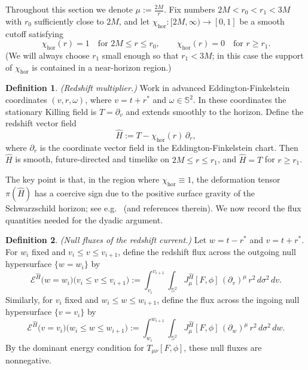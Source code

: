 \documentclass[11pt]{article}
\numberwithin{equation}{section}
\theoremstyle{plain}
\theoremstyle{definition}
\newtheorem{definition}{Definition}[section]
\theoremstyle{remark}
\begin{document}
Throughout this section we denote $\mu:=\frac{2M}{r}$.
Fix numbers $2M<r_{0}<r_{1}<3M$ with $r_{0}$ sufficiently close to $2M$, and let $\chi_{\mathrm{hor}}:[2M,\infty)\to[0,1]$ be a smooth cutoff satisfying
\begin{equation}
\chi_{\mathrm{hor}}(r)=1 \quad\text{for } 2M\le r\le r_{0},
\qquad
\chi_{\mathrm{hor}}(r)=0 \quad\text{for } r\ge r_{1}.
\end{equation}
(We will always choose $r_{1}$ small enough so that $r_{1}<3M$; in this case the support of $\chi_{\mathrm{hor}}$ is contained in a near-horizon region.)

\begin{definition}\label{definitionH}
\emph{(Redshift multiplier.)}
Work in advanced Eddington-Finkelstein coordinates $(v,r,\omega)$, where $v=t+r^{\ast}$ and $\omega\in\mathbb S^{2}$.
In these coordinates the stationary Killing field is $T=\partial_v$ and extends smoothly to the horizon.
Define the redshift vector field
\begin{equation}\label{H}
\hat{H} := T - \chi_{\mathrm{hor}}(r)\,\partial_r,
\end{equation}
where $\partial_r$ is the coordinate vector field in the Eddington-Finkelstein chart.
Then $\hat{H}$ is smooth, future-directed and timelike on $2M\le r\le r_{1}$, and $\hat{H}=T$ for $r\ge r_{1}$.
\end{definition}

The key point is that, in the region where $\chi_{\mathrm{hor}}\equiv 1$, the deformation tensor $\pi(\hat H)$ has a coercive sign due to the positive surface gravity of the Schwarzschild horizon; see e.g.\ \cite{dafermos} (and references therein). We now record the flux quantities needed for the dyadic argument.

\begin{definition}\label{defnear1}
\emph{(Null fluxes of the redshift current.)}
Let $w=t-r^{\ast}$ and $v=t+r^{\ast}$.
For $w_i$ fixed and $v_i\le v\le v_{i+1}$, define the redshift flux across the outgoing null hypersurface $\{w=w_i\}$ by
\begin{equation}\label{eH1}
\mathcal{E}^{\hat H}\bigl(w=w_i\bigr)\bigl(v_i\le v\le v_{i+1}\bigr)
:=
\int_{v_i}^{v_{i+1}}\int_{\mathbb S^{2}}
J_\mu^{\hat H}[F,\phi]\,(\partial_v)^\mu\, r^{2}\,d\sigma^{2}\,dv.
\end{equation}
Similarly, for $v_i$ fixed and $w_i\le w\le w_{i+1}$, define the flux across the ingoing null hypersurface $\{v=v_i\}$ by
\begin{equation}\label{eH2}
\mathcal{E}^{\hat H}\bigl(v=v_i\bigr)\bigl(w_i\le w\le w_{i+1}\bigr)
:=
\int_{w_i}^{w_{i+1}}\int_{\mathbb S^{2}}
J_\mu^{\hat H}[F,\phi]\,(\partial_w)^\mu\, r^{2}\,d\sigma^{2}\,dw.
\end{equation}
By the dominant energy condition for $T_{\mu\nu}[F,\phi]$, these null fluxes are nonnegative.
\end{definition}
\end{document}
